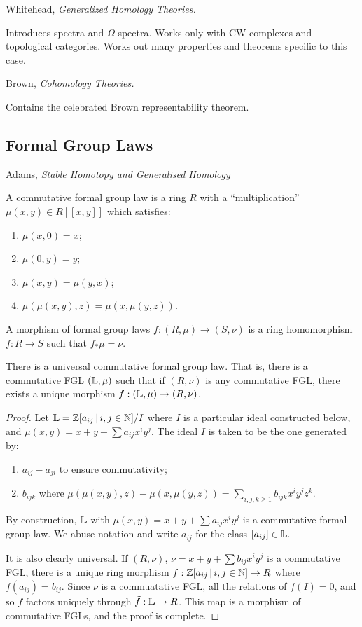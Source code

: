 \documentclass{article}%
\begin{document}
Whitehead, {\it Generalized Homology Theories.} 

Introduces spectra and $\Omega$-spectra. Works only with CW complexes
and topological categories. Works out many properties and theorems
specific to this case.

Brown, {\it Cohomology Theories.} 

Contains the celebrated Brown representability theorem.

\subsection{Formal Group Laws}
Adams, {\it Stable Homotopy and Generalised Homology} 

\begin{definition}
A commutative formal group law is a ring $R$ with a ``multiplication''
$\mu(x,y)\in R[[x,y]]$ which satisfies:
\begin{enumerate}
  \item $\mu(x,0)=x$;
  \item $\mu(0,y)=y$;
  \item $\mu(x,y)=\mu(y,x)$;
  \item $\mu(\mu(x,y),z)=\mu(x,\mu(y,z))$.
\end{enumerate}

A morphism of formal group laws $f:(R,\mu)\rightarrow (S,\nu)$ is a
ring homomorphism $f: R \rightarrow S$ such that $f_*\mu = \nu$. 
\end{definition}

\begin{theorem}
There is a universal commutative formal group law. That is, there is a
commutative FGL $(\mathbb{L},\mu)$ such that if $(R,\nu)$ is any commutative
FGL, there exists a unique morphism $f: (\mathbb{L},\mu)\rightarrow
(R,\nu)$. 
\end{theorem}

\begin{proof}
Let $\mathbb{L}=\mathbb{Z}[a_{ij} \, \vert \, i,j \in \mathbb{N} ]/I$ where $I$ is a particular
ideal constructed below, and $\mu(x,y)=x+y+\sum a_{ij}x^iy^j$. The
ideal $I$ is taken to be the one generated by:
\begin{enumerate}
\item $a_{ij}-a_{ji}$ to ensure commutativity;
\item $b_{ijk}$ where $\mu(\mu(x,y),z)-\mu(x,\mu(y,z)) =
\sum_{i,j,k\geq 1} b_{ijk}x^iy^jz^k$.
\end{enumerate}
By construction, $\mathbb{L}$ with $\mu(x,y)=x+y+\sum a_{ij}x^iy^j$ is a
commutative formal group law. We abuse notation and write $a_{ij}$ for
the class $[a_{ij}] \in \mathbb{L}$.

It is also clearly universal. If $(R,\nu)$, $\nu = x+y + \sum
b_{ij}x^iy^j$ is a commutative FGL, there is a unique ring morphism $f
: \mathbb{Z}[a_{ij} \, \vert \, i,j \in \mathbb{N} ] \rightarrow R$ where $f(a_{ij}) =
b_{ij}$. Since $\nu$ is a commuatative FGL, all the relations of
$f(I)=0$, and so $f$ factors uniquely through $\tilde{f}: \mathbb{L}
\rightarrow R$. This map is a morphism of commutative FGLs, and the
proof is complete.
\end{proof}
\end{document}
